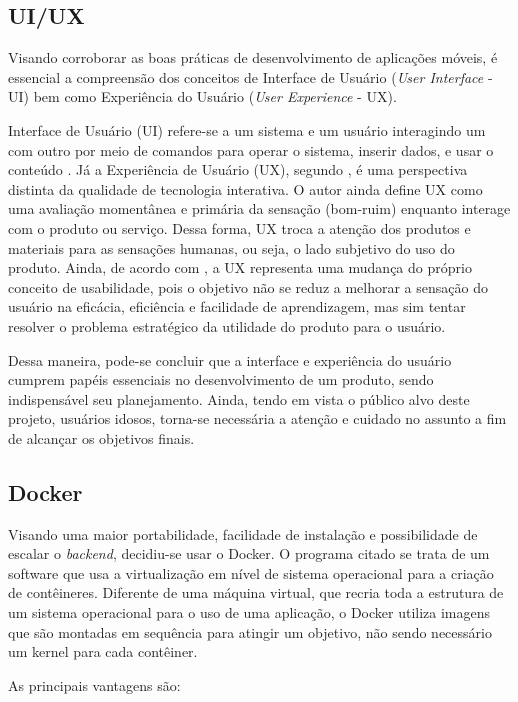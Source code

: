 \subsection{UI/UX}
Visando corroborar as boas práticas de desenvolvimento de aplicações móveis, é essencial a compreensão dos conceitos de Interface de Usuário (\textit{User Interface} - UI) bem como Experiência do Usuário (\textit{User Experience} - UX). %

Interface de Usuário (UI) refere-se a um sistema e um usuário interagindo um com outro por meio de comandos para operar o sistema, inserir dados, e usar o conteúdo \citep{joo2015}. Já a Experiência de Usuário (UX), segundo \cite{marc2008}, é uma perspectiva distinta da qualidade de tecnologia interativa. O autor ainda define UX como uma avaliação momentânea e primária da sensação (bom-ruim) enquanto interage com o produto ou serviço. Dessa forma, UX troca a atenção dos produtos e materiais para as sensações humanas, ou seja, o lado subjetivo do uso do produto. Ainda, de acordo com \cite{castilla2017}, a UX representa uma mudança do próprio conceito de usabilidade, pois o objetivo não se reduz a melhorar a sensação do usuário na eficácia, eficiência e facilidade de aprendizagem, mas sim tentar resolver o problema estratégico da utilidade do produto para o usuário. 

Dessa maneira, pode-se concluir que a interface e experiência do usuário cumprem papéis essenciais no desenvolvimento de um produto, sendo indispensável seu planejamento. Ainda, tendo em vista o público alvo deste projeto, usuários idosos, torna-se necessária a atenção e cuidado no assunto a fim de alcançar os objetivos finais.

\subsection{Docker}
Visando uma maior portabilidade, facilidade de instalação e possibilidade de escalar o \textit{backend}, decidiu-se usar o Docker.
O programa citado se trata de um software que usa a virtualização em nível de sistema operacional para a criação de contêineres. Diferente de uma máquina virtual, que recria toda a estrutura de um sistema operacional para o uso de uma aplicação, o Docker utiliza imagens que são montadas em sequência para atingir um objetivo, não sendo necessário um kernel para cada contêiner.

As principais vantagens são:

